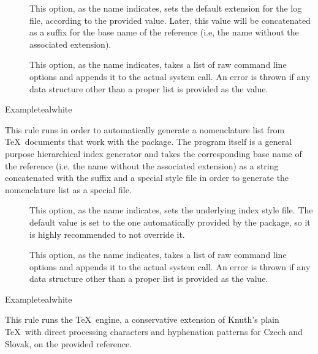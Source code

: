 \begin{description}
\begin{description}
\item[] This option, as the name indicates, sets the default extension for the log file, according to the provided value. Later, this value will be concatenated as a suffix for the base name of the  reference (i.e, the name without the associated extension).

\item[] This option, as the name indicates, takes a list of raw command line options and appends it to the actual system call. An error is thrown if any data structure other than a proper list is provided as the value.
\end{description}

\begin{codebox}{Example}{teal}{\icnote}{white}
\end{codebox}

\item[\rulebox{nomencl}{Marco Daniel, Nicola Talbot, Paulo Cereda}] This rule runs  in order to automatically generate a nomenclature list from \TeX\ documents that work with the  package. The program itself is a general purpose hierarchical index generator and takes the corresponding base name of the  reference (i.e, the name without the associated extension) as a string concatenated with the  suffix and a special style file in order to generate the nomenclature list as a special  file.

\begin{description}
\item[] This option, as the name indicates, sets the underlying index style file. The default value is set to the one automatically provided by the  package, so it is highly recommended to not override it.

\item[] This option, as the name indicates, takes a list of raw command line options and appends it to the actual system call. An error is thrown if any data structure other than a proper list is provided as the value.
\end{description}

\begin{codebox}{Example}{teal}{\icnote}{white}
\end{codebox}

\item[\rulebox{pdfcsplain}{Paulo Cereda}] This rule runs the  \TeX\ engine, a conservative extension of Knuth's plain \TeX\ with direct processing characters and hyphenation patterns for Czech and Slovak, on the provided  reference.


\end{description}
